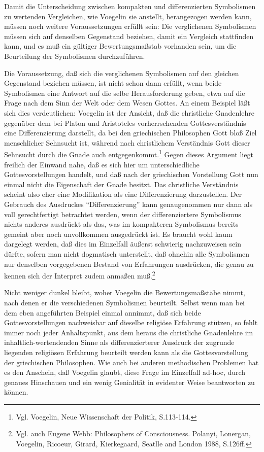Damit die Unterscheidung zwischen kompakten und differenzierten Symbolismen zu
wertenden Vergleichen, wie Voegelin sie anstellt, herangezogen werden kann,
müssen noch weitere Voraussetzungen erfüllt sein: Die verglichenen Symbolismen
müssen sich auf denselben Gegenstand beziehen, damit ein Vergleich
stattfinden kann, und es muß ein gültiger Bewertungsmaßstab vorhanden sein, um
die Beurteilung der Symbolismen durchzuführen.

Die Voraussetzung, daß sich die verglichenen Symbolismen auf den gleichen
Gegenstand beziehen müssen, ist nicht schon dann erfüllt, wenn beide
Symbolismen eine Antwort auf die selbe Herausforderung geben, etwa auf die
Frage nach dem Sinn der Welt oder dem Wesen Gottes. An einem Beispiel läßt
sich dies verdeutlichen: Voegelin ist der Ansicht, daß die christliche
Gnadenlehre gegenüber dem bei Platon und Aristoteles vorherrschenden
Gottesverständnis eine Differenzierung darstellt, da bei den griechischen
Philosophen Gott bloß Ziel menschlicher Sehnsucht ist, während nach
christlichem Verständnis Gott dieser Sehnsucht durch die Gnade auch
entgegenkommt.\footnote{Vgl. Voegelin, Neue Wissenschaft der Politik,
  S.113-114.} Gegen dieses Argument liegt freilich der Einwand nahe, daß es
sich hier um unterschiedliche Gottesvorstellungen handelt, und daß nach der
griechischen Vorstellung Gott nun einmal nicht die Eigenschaft der Gnade
besitzt. Das christliche Verständnis scheint also eher eine Modifikation als
eine Differenzierung darzustellen. Der Gebrauch des Ausdruckes
"`Differenzierung"' kann genaugenommen nur dann als voll gerechtfertigt
betrachtet werden, wenn der differenziertere Symbolismus nichts anderes
ausdrückt als das, was im kompakteren Symbolismus bereits gemeint aber noch
unvollkommen ausgedrückt ist. Es braucht wohl kaum dargelegt werden, daß dies
im Einzelfall äußerst schwierig nachzuweisen sein dürfte, sofern man nicht
dogmatisch unterstellt, daß ohnehin alle Symbolismen nur denselben
vorgegebenen Bestand von Erfahrungen ausdrücken, die genau zu kennen sich der
Interpret zudem anmaßen muß.\footnote{Vgl. auch Eugene Webb: Philosophers of
  Consciousness. Polanyi, Lonergan, Voegelin, Ricoeur, Girard, Kierkegaard,
  Seatlle and London 1988, S.126ff.}

Nicht weniger dunkel bleibt, woher Voegelin die Bewertungsmaßstäbe nimmt, nach
denen er die verschiedenen Symbolismen beurteilt. Selbst wenn man bei dem eben
angeführten Beispiel einmal annimmt, daß sich beide Gottesvorstellungen
nachweisbar auf dieselbe religiöse Erfahrung stützen, so fehlt immer noch
jeder Anhaltspunkt, aus dem heraus die christliche Gnadenlehre im
inhaltlich-wertendenden Sinne als differenzierterer Ausdruck der zugrunde
liegenden religiösen Erfahrung beurteilt werden kann als die Gottesvorstellung
der griechischen Philosophen. Wie auch bei anderen methodischen Problemen hat
es den Anschein, daß Voegelin glaubt, diese Frage im Einzelfall ad-hoc, durch
genaues Hinschauen und ein wenig Genialität in evidenter Weise beantworten zu
können.

